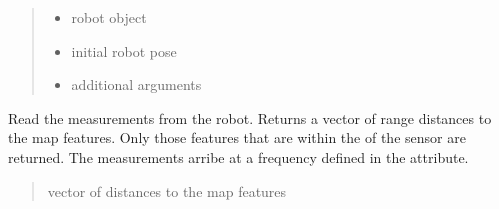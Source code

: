 \documentclass[letterpaper,10pt,english]{sphinxmanual}
\begin{document}
\begin{fulllineitems}
\begin{fulllineitems}
\begin{quote}
\begin{description}
\begin{itemize}
\item {} 
\sphinxAtStartPar
{} \textendash{} robot object

\item {} 
\sphinxAtStartPar
{} \textendash{} initial robot pose

\item {} 
\sphinxAtStartPar
{} \textendash{} additional arguments

\end{itemize}

\end{description}\end{quote}

\end{fulllineitems}


\begin{fulllineitems}
\label{\detokenize{GridLocalization:GL_3DOFDifferentialDrive.GL_3DOFDifferentialDrive.GetMeasurements}}
\pysigstartsignatures
{}
\pysigstopsignatures
\sphinxAtStartPar
Read the measurements from the robot. Returns a vector of range distances to the map features.
Only those features that are within the  of the sensor are returned.
The measurements arribe at a frequency defined in the  attribute.
\begin{quote}\begin{description}
\sphinxAtStartPar
vector of distances to the map features

\end{description}\end{quote}

\end{fulllineitems}



\end{fulllineitems}
\end{document}

